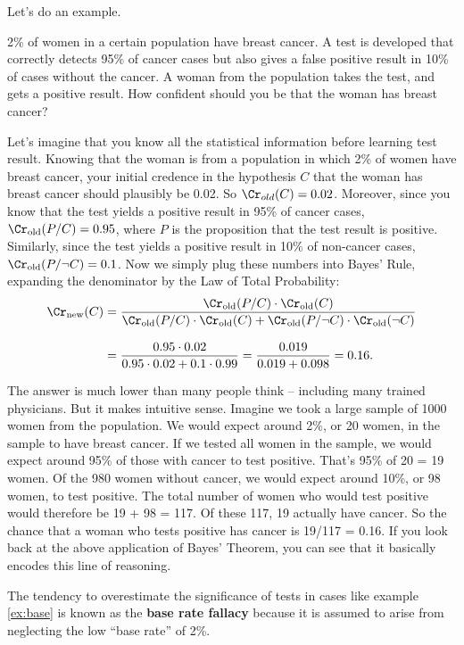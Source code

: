 Let's do an example.
\begin{example}\label{ex:base}
  2\% of women in a certain population have breast cancer. A test is
  developed that correctly detects 95\% of cancer cases but also gives
  a false positive result in 10\% of cases without the cancer. A woman
  from the population takes the test, and gets a positive result. How
  confident should you be that the woman has breast cancer?
\end{example}

Let's imagine that you know all the statistical information before
learning test result. Knowing that the woman is from a
population in which 2\% of women have breast cancer, your initial
credence in the hypothesis $C$ that the woman has breast cancer should
plausibly be 0.02. So $\Cr_{old}(C) = 0.02$. Moreover, since you know
that the test yields a positive result in 95\% of cancer cases,
$\Cr_{\text{old}}(P/C) = 0.95$, where $P$ is the proposition that the
test result is positive. Similarly, since the test yields a positive
result in 10\% of non-cancer cases,
$\Cr_{\text{old}}(P/\neg C) = 0.1$. Now we simply plug these numbers
into Bayes' Rule, expanding the denominator by the Law of Total
Probability:
%
\begin{align*}
  \Cr_{\text{new}}(C) &= \frac{\Cr_{\text{old}}(P/C) \cdot
  \Cr_{\text{old}}(C)}{\Cr_\text{old}(P/C) \cdot \Cr_\text{old}(C) +
  \Cr_\text{old}(P/\neg C)\cdot \Cr_\text{old}(\neg C)}\\[3mm]
  &= \frac{0.95 \cdot 0.02}{0.95 \cdot 0.02 + 0.1 \cdot 0.99} = \frac{0.019}{0.019 + 0.098} = 0.16.
\end{align*}

The answer is much lower than many people think -- including many trained 
physicians. But it makes intuitive sense. Imagine we
took a large sample of 1000 women from the population. We would expect
around 2\%, or 20 women, in the sample to have breast cancer. If we
tested all women in the sample, we would expect around 95\% of those
with cancer to test positive. That's 95\% of 20 = 19 women. Of the 980
women without cancer, we would expect around 10\%, or 98 women, to
test positive. The total number of women who would test positive would
therefore be 19 + 98 = 117. Of these 117, 19 actually have cancer. So the
chance that a woman who tests positive has cancer is 19/117 = 0.16. If
you look back at the above application of Bayes' Theorem, you can see
that it basically encodes this line of reasoning.

The tendency to overestimate the significance of tests in cases like example
\ref{ex:base} is known as the \textbf{base rate fallacy} because it is
assumed to arise from neglecting the low ``base rate'' of 2\%.

